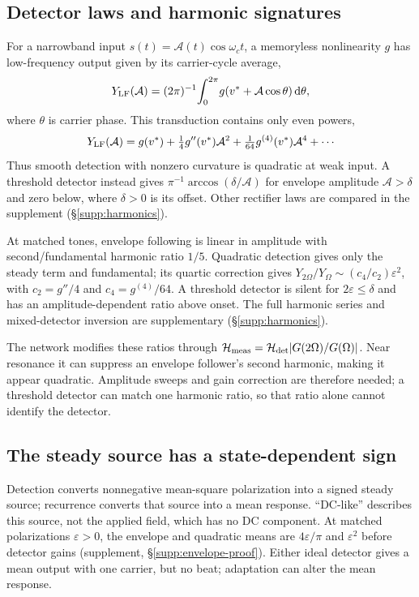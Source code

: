 \subsection{Detector laws and harmonic signatures}\label{sec:transduction}
For a narrowband input $s(t)=\mathcal A(t)\cos\omega_c t$, a memoryless
nonlinearity $g$ has low-frequency output given by its carrier-cycle average,
\[
Y_{\rm LF}(\mathcal A)=(2\pi)^{-1}\!\int_0^{2\pi}\!g(v^*+\mathcal A\cos\theta)\,\mathrm{d}\theta,
\]
where $\theta$ is carrier phase. This transduction contains
only even powers,
\begin{equation}
Y_{\rm LF}(\mathcal A)=g(v^*)+\tfrac14 g''(v^*)\mathcal A^2+\tfrac1{64}g^{(4)}(v^*)\mathcal A^4+\cdots
\label{eq:cycavg}
\end{equation}
Thus smooth detection with nonzero curvature is quadratic at weak input.
A threshold detector instead gives
$\pi^{-1}\arccos(\delta/\mathcal A)$ for envelope amplitude
$\mathcal A>\delta$ and zero below, where $\delta>0$ is its offset.
Other rectifier laws are compared in the supplement (\S\ref{supp:harmonics}).

At matched tones, envelope following is linear in amplitude with
second/fundamental harmonic ratio $1/5$. Quadratic detection gives only
the steady term and fundamental; its quartic correction gives
$Y_{2\Omega}/Y_\Omega\sim(c_4/c_2)\varepsilon^2$, with
$c_2=g''/4$ and $c_4=g^{(4)}/64$. A threshold detector is silent for
$2\varepsilon\le\delta$ and has an amplitude-dependent ratio above onset.
The full harmonic series and mixed-detector inversion are supplementary
(\S\ref{supp:harmonics}).
\ifjne\else

\fi

The network modifies these ratios through
$\mathcal H_{\rm meas}=\mathcal H_{\rm det}|G(2\Omega)/G(\Omega)|$.
Near resonance it can suppress an envelope follower's second harmonic,
making it appear quadratic. Amplitude sweeps and gain correction are
therefore needed; a threshold detector can match one harmonic ratio, so that
ratio alone cannot identify the detector.

\subsection{The steady source has a state-dependent sign}\label{sec:dc}
Detection converts nonnegative mean-square polarization into a signed steady
source; recurrence converts that source into a mean response. ``DC-like''
describes this source, not the applied field, which has no DC component.
At matched polarizations $\varepsilon>0$,
the envelope and quadratic means are $4\varepsilon/\pi$ and
$\varepsilon^2$ before detector gains (supplement, \S\ref{supp:envelope-proof}). Either ideal detector gives a mean
output with one carrier, but no beat; adaptation can alter the mean response.


